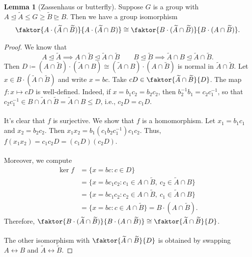 \documentclass[10pt,letterpaper,cm]{nupset}
\theoremstyle{definition}
\theoremstyle{theorem}
\newtheorem{lemma}[definition]{Lemma}
\theoremstyle{remark}
\newcommand{\1}{\mathbf{1}}
\newcommand{\0}{\vec 0}
\begin{document}
\begin{lemma}[Zassenhaus or butterfly]
Suppose $G$ is a group with $A \unlhd \widetilde{A} \leq G \geq \widetilde{B} \unrhd B$. Then we have a group isomorphism $$\faktor{A\cdot (\widetilde{A} \cap \widetilde{B})}{A \cdot (\widetilde{A} \cap B)} \cong \faktor{B \cdot (\widetilde{A} \cap \widetilde{B})}{B\cdot (A \cap \widetilde{B})}.$$
\end{lemma}
\begin{proof}
We know that $$A \unlhd \widetilde{A} \implies A \cap \widetilde{B} \unlhd \widetilde{A} \cap \widetilde{B} \quad \quad B \unlhd \widetilde{B} \implies \widetilde{A} \cap B \unlhd \widetilde{A} \cap \widetilde{B}.$$ 
Then $D\coloneqq  ({A} \cap \widetilde{B}) \cdot (\widetilde{A} \cap {B}) \cong  (\widetilde{A} \cap {B}) \cdot ({A} \cap \widetilde{B})$ is normal in $\widetilde{A} \cap \widetilde{B}$. Let $x \in B \cdot ( \widetilde{A} \cap \widetilde{B})$ and write $x = bc$. Take $cD \in \faktor{\widetilde{A} \cap \widetilde{B}}{D}$. The map $f: x \mapsto cD$ is well-defined. Indeed, if $x = b_1c_2 = b_2c_2$, then $b_2^{-1}b_1 = c_2c_1^{-1}$, so that $c_2c_1^{-1} \in B \cap \widetilde{A} \cap \widetilde{B} = \widetilde{A}\cap B \leq D$, i.e., $c_2D = c_1D$.
\\ \\It's clear that $f$ is surjective. We show that $f$ is a homomorphism. Let $x_1= b_1c_1$ and $x_2 = b_2c_2$. Then $x_1x_2 = b_1(c_1b_2c_1^{-1})c_1c_2$. Thus, $f(x_1x_2) = c_1c_2D = (c_1D)(c_2D)$.
\\ \\
Moreover, we compute 
\begin{align*} 
\ker f &= \{x = bc : c \in D\}  
\\ & = \{ x= bc_1c_2 : c_1\in {A} \cap \widetilde{B}, \  c_2 \in \widetilde{A} \cap {B}\}
\\ & = \{ x= bc_1c_2 : c_2\in {A} \cap \widetilde{B}, \  c_1 \in \widetilde{A} \cap {B}\} 
\\ & = \{x = bc : c \in A \cap \widetilde{B}\} = B \cdot (A \cap \widetilde{B}).
\end{align*} Therefore, $\faktor{B \cdot ( \widetilde{A} \cap \widetilde{B})}{ B \cdot (A \cap \widetilde{B})} \cong \faktor{\widetilde{A} \cap \widetilde{B}}{D}$. 
\\ \\ The other isomorphism with $\faktor{\widetilde{A} \cap \widetilde{B}}{D}$ is obtained by swapping $A \longleftrightarrow B$ and $\widetilde{A} \longleftrightarrow \widetilde{B}$.
\end{proof}
\end{document}
